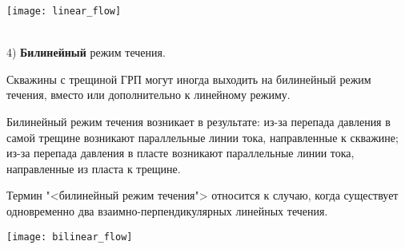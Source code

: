 \begin{center}
\texttt{[image: linear\_flow]}
\end{center}
\ \\

4) \textbf{Билинейный} режим течения.

Скважины с трещиной ГРП могут иногда выходить на билинейный режим течения, вместо или дополнительно к линейному режиму.

Билинейный режим течения возникает в результате: из-за перепада давления в самой трещине возникают параллельные линии тока, направленные к скважине; из-за перепада давления в пласте возникают параллельные линии тока, направленные из пласта к трещине.

Термин "<билинейный режим течения"> относится к случаю, когда существует одновременно два взаимно-перпендикулярных линейных течения.
\begin{center}
\texttt{[image: bilinear\_flow]}
\end{center}
\ \\

